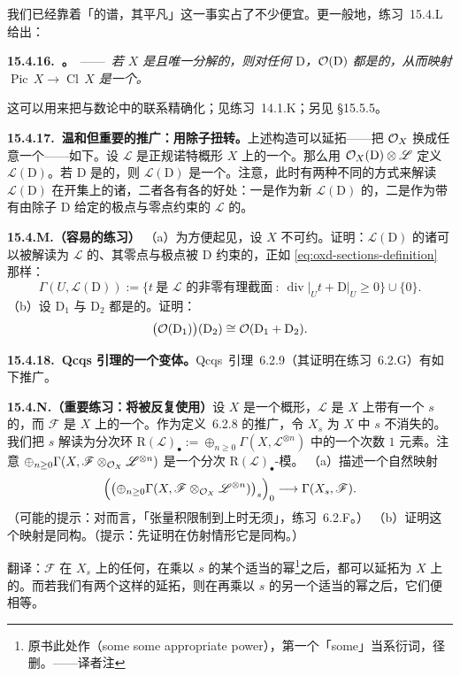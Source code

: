 我们已经靠着「\trUFD{}的谱，其\trPicardGroup{}平凡」这一事实占了不少便宜。更一般地，\mbox{练习~15.4.L} 给出：

\textbf{15.4.16.\ \trhProposition{}。}\ ——\ \emph{若 $X$ 是\trNoetherian{}且唯一分解的，则对任何\trWeilDivisor{} $\mathrm{D}$，$\mathcal{O}(\mathrm{D})$ 都是\trInvertible{}的，从而映射 $\operatorname{Pic}\,X\to\operatorname{Cl}\,X$ 是一个\trIsomorphism。}

这可以用来把与数论中\trClassGroup{}的联系精确化；见\mbox{练习~14.1.K}；另见 \S15.5.5。

\textbf{15.4.17.\ 温和但重要的推广：用除子扭转\trLineBundle。}\quad 上述构造可以延拓——把 $\mathcal{O}_X$ 换成任意一个\trInvertibleSheaf——如下。设 $\mathscr{L}$ 是正规诺特概形 $X$ 上的一个\trInvertibleSheaf。那么用 $\mathcal{O}_X(\mathrm{D})\otimes\mathscr{L}$ 定义 $\mathscr{L}(\mathrm{D})$。若 $\mathrm{D}$ 是\trLocallyPrincipal{}的，则 $\mathscr{L}(\mathrm{D})$ 是一个\trLineBundle。注意，此时有两种不同的方式来解读 $\mathscr{L}(\mathrm{D})$ 在开集上的诸\trSection，二者各有各的好处：一是作为新\trLineBundle{} $\mathscr{L}(\mathrm{D})$ 的\trSection，二是作为带有由除子 $\mathrm{D}$ 给定的极点与零点约束的 $\mathscr{L}$ 的\trRational\trSection。

\textbf{15.4.M.（容易的练习）}\quad
（a）为方便起见，设 $X$ 不可约。证明：$\mathscr{L}(\mathrm{D})$ 的诸\trSection{}可以被解读为 $\mathscr{L}$ 的、其零点与极点被 $\mathrm{D}$ 约束的\trRational\trSection，正如 \eqref{eq:oxd-sections-definition} 那样：
\[
\Gamma(U,\mathscr{L}(\mathrm{D})):=\{t\ \text{是 }\mathscr{L}\text{ 的非零有理截面}\ :\ \operatorname{div}\vert_U t+\mathrm{D}\vert_U\ge 0\}\cup\{0\}.
\]
（b）设 $\mathrm{D}_1$ 与 $\mathrm{D}_2$ 都是\trLocallyPrincipal{}的。证明：
\[
\bigl(\mathcal{O}(\mathrm{D}_1)\bigr)(\mathrm{D}_2)\cong\mathcal{O}(\mathrm{D}_1+\mathrm{D}_2).
\]

\textbf{15.4.18.\ Qcqs 引理的一个变体。}\quad \mbox{Qcqs 引理~6.2.9}（其证明在\mbox{练习~6.2.G}）有如下推广。

\textbf{15.4.N.（重要练习：将被反复使用）}\quad 设 $X$ 是一个\trQuasicompact\trQuasiSeparated{}概形，$\mathscr{L}$ 是 $X$ 上带有一个\trSection{} $s$ 的\trInvertibleSheaf，而 $\mathscr{F}$ 是 $X$ 上的一个\trQCSheaf。作为\mbox{定义~6.2.8} 的推广，令 $X_s$ 为 $X$ 中 $s$ 不消失的\trOpenSubset。我们把 $s$ 解读为分次环 $\mathrm{R}(\mathscr{L})_\bullet:=\oplus_{n\ge 0}\Gamma(X,\mathscr{L}^{\otimes n})$ 中的一个次数 $1$ 元素。注意 $\oplus_{n\ge 0}\Gamma(X,\mathscr{F}\otimes_{\mathcal{O}_X}\mathscr{L}^{\otimes n})$ 是一个分次 $\mathrm{R}(\mathscr{L})_\bullet$-模。
（a）描述一个自然映射
\[
\Bigl(\bigl(\oplus_{n\ge 0}\Gamma(X,\mathscr{F}\otimes_{\mathcal{O}_X}\mathscr{L}^{\otimes n})\bigr)_s\Bigr)_0\longrightarrow\Gamma(X_s,\mathscr{F}).
\]
（可能的提示：对\trQCSheaf{}而言，「张量积限制到\trAffine\trSubscheme{}上时无须\trSheafification」，\mbox{练习~6.2.F}。）
（b）证明这个映射是同构。（提示：先证明在仿射情形它是同构。）

翻译：$\mathscr{F}$ 在 $X_s$ 上的任何\trSection，在乘以 $s$ 的某个适当的幂\footnote{原书此处作（some some appropriate power），第一个「some」当系衍词，径删。——译者注}之后，都可以延拓为 $X$ 上的\trSection。而若我们有两个这样的延拓，则在再乘以 $s$ 的另一个适当的幂之后，它们便相等。

